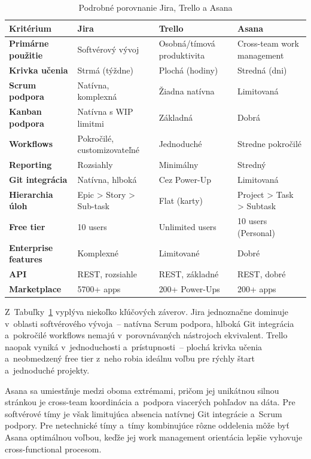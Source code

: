 \begin{table}[ht]
\centering
\caption{Podrobné porovnanie Jira, Trello a Asana}
\label{tab:porovnanie-nastrojov}
\begin{tabular}{|p{3.2cm}|p{3.5cm}|p{3.5cm}|p{3.5cm}|}
\hline
\textbf{Kritérium} & \textbf{Jira} & \textbf{Trello} & \textbf{Asana} \\
\hline
\textbf{Primárne použitie} & Softvérový vývoj & Osobná/tímová produktivita & Cross-team work management \\
\hline
\textbf{Krivka učenia} & Strmá (týždne) & Plochá (hodiny) & Stredná (dni) \\
\hline
\textbf{Scrum podpora} & Natívna, komplexná & Žiadna natívna & Limitovaná \\
\hline
\textbf{Kanban podpora} & Natívna s WIP limitmi & Základná & Dobrá \\
\hline
\textbf{Workflows} & Pokročilé, customizovateľné & Jednoduché & Stredne pokročilé \\
\hline
\textbf{Reporting} & Rozsiahly & Minimálny & Stredný \\
\hline
\textbf{Git integrácia} & Natívna, hlboká & Cez Power-Up & Limitovaná \\
\hline
\textbf{Hierarchia úloh} & Epic > Story > Sub-task & Flat (karty) & Project > Task > Subtask \\
\hline
\textbf{Free tier} & 10 users & Unlimited users & 10 users (Personal)  \\
\hline
\textbf{Enterprise features} & Komplexné & Limitované & Dobré \\
\hline
\textbf{API} & REST, rozsiahle & REST, základné & REST, dobré \\
\hline
\textbf{Marketplace} & 5700+ apps & 200+ Power-Ups & 200+ apps \\
\hline
\end{tabular}
\end{table}

Z~Tabuľky~\ref{tab:porovnanie-nastrojov} vyplýva niekoľko kľúčových záverov. Jira jednoznačne dominuje v~oblasti softvérového vývoja~-- natívna Scrum podpora, hlboká Git integrácia a~pokročilé workflows nemajú v~porovnávaných nástrojoch ekvivalent. Trello naopak vyniká v~jednoduchosti a~prístupnosti~-- plochá krivka učenia a~neobmedzený free tier z~neho robia ideálnu voľbu pre rýchly štart a~jednoduché projekty.

Asana sa umiestňuje medzi oboma extrémami, pričom jej unikátnou silnou stránkou je cross-team koordinácia a~podpora viacerých pohľadov na dáta. Pre softvérové tímy je však limitujúca absencia natívnej Git integrácie a~Scrum podpory. Pre netechnické tímy a~tímy kombinujúce rôzne oddelenia môže byť Asana optimálnou voľbou, keďže jej work management orientácia lepšie vyhovuje cross-functional procesom.

